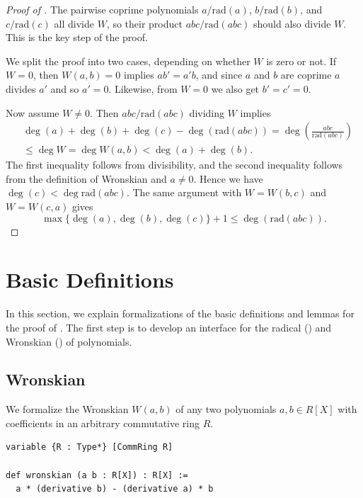 \documentclass[runningheads]{llncs}
\newcommand{\rad}{\mathrm{rad}}
\begin{document}
\begin{proof}[Proof of ]
The pairwise coprime polynomials $a / \rad(a)$, $b / \rad(b)$, and $c / \rad(c)$ all divide $W$, so their product $abc / \rad(abc)$ should also divide $W$. This is the key step of the proof.

We split the proof into two cases, depending on whether $W$ is zero or not.
If $W = 0$, then $W(a, b) = 0$ implies $a b' = a' b$, and since $a$ and $b$ are coprime $a$ divides $a'$ and so $a' = 0$. Likewise, from $W = 0$ we also get $b' = c' = 0$.

Now assume $W \neq 0$. Then $abc / \rad(abc)$ dividing $W$ implies
\begin{align*}
    &\deg(a) + \deg(b) + \deg(c) - \deg(\rad(abc)) = \deg \left(\frac{abc}{\rad(abc)}\right) \\
    &\le \deg W = \deg W(a, b) < \deg(a) + \deg(b).
\end{align*}
The first inequality follows from divisibility, and the second inequality follows from the definition of Wronskian and $a \neq 0$.
Hence we have $\deg(c) < \deg \rad(abc)$. The same argument with $W = W(b, c)$ and $W = W(c, a)$ gives
\[
\max\{\deg(a), \deg(b), \deg(c)\} + 1\le \deg(\rad(abc)).
\]
\end{proof}

\section{Basic Definitions}
\label{sec:prelim-formalize}


In this section, we explain formalizations of the basic definitions and lemmas for the proof of .
The first step is to develop an interface for the radical () and Wronskian () of polynomials.


\subsection{Wronskian}
\label{subsec:wronskian}

We formalize the Wronskian $W(a, b)$ of any two polynomials $a, b \in R[X]$ with coefficients in an arbitrary commutative ring $R$.



\begin{verbatim}
variable {R : Type*} [CommRing R]

def wronskian (a b : R[X]) : R[X] :=
  a * (derivative b) - (derivative a) * b
\end{verbatim}
\end{document}
